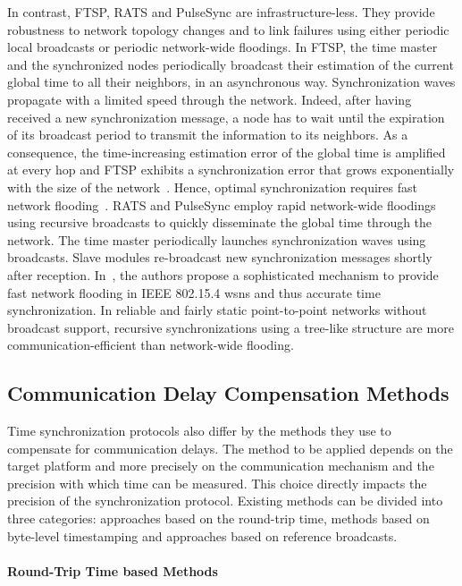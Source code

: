 In contrast, FTSP, RATS and PulseSync are infrastructure-less. They provide robustness to network topology changes and to link failures using either periodic local broadcasts or periodic network-wide floodings. In FTSP, the time master and the synchronized nodes periodically broadcast their estimation of the current global time to all their neighbors, in an asynchronous way. Synchronization waves propagate with a limited speed through the network. Indeed, after having received a new synchronization message, a node has to wait until the expiration of its broadcast period to transmit the information to its neighbors. As a consequence, the time-increasing estimation error of the global time is amplified at every hop and FTSP exhibits a synchronization error that grows exponentially with the size of the network~\cite{lenzen2009optimal}. Hence, optimal synchronization requires fast network flooding~\cite{lenzen2009optimal}. RATS and PulseSync employ rapid network-wide floodings using recursive broadcasts to quickly disseminate the global time through the network. The time master periodically launches synchronization waves using broadcasts. Slave modules re-broadcast new synchronization messages shortly after reception. In~\cite{ferrari2011efficient}, the authors propose a sophisticated mechanism to provide fast network flooding in IEEE 802.15.4 \glspl{wsn} and thus accurate time synchronization. In reliable and fairly static point-to-point networks without broadcast support, recursive synchronizations using a tree-like structure are more communication-efficient than network-wide flooding.

\subsection{Communication Delay Compensation Methods}
\label{section:time-sync:communication-delay-comp-methods}

Time synchronization protocols also differ by the methods they use to compensate for communication delays. The method to be applied depends on the target platform and more precisely on the communication mechanism and the precision with which time can be measured. This choice directly impacts the precision of the synchronization protocol. Existing methods can be divided into three categories: approaches based on the round-trip time, methods based on byte-level timestamping and approaches based on reference broadcasts.

\paragraph{Round-Trip Time based Methods}


